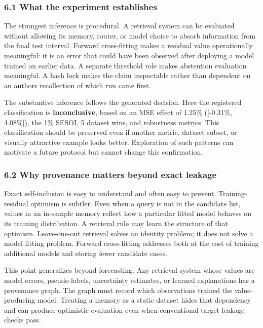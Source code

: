 \documentclass[
]{article}
\begin{document}
\subsubsection{6.1 What the experiment
establishes}\label{61-what-the-experiment-establishes}

The strongest inference is procedural. A retrieval system can be
evaluated without allowing its memory, router, or model choice to absorb
information from the final test interval. Forward cross-fitting makes a
residual value operationally meaningful: it is an error that could have
been observed after deploying a model trained on earlier data. A
separate threshold role makes abstention evaluation meaningful. A hash
lock makes the claim inspectable rather than dependent on an
author\textquotesingle s recollection of which run came first.

The substantive inference follows the generated decision. Here the
registered classification is \textbf{inconclusive}, based on an MSE
effect of 1.25\% ({[}-0.31\%, 4.08\%{]}), the 1\% SESOI, 5 dataset wins,
and robustness metrics. This classification should be preserved even if
another metric, dataset subset, or visually attractive example looks
better. Exploration of such patterns can motivate a future protocol but
cannot change this confirmation.

\subsubsection{6.2 Why provenance matters beyond exact
leakage}\label{62-why-provenance-matters-beyond-exact-leakage}

Exact self-inclusion is easy to understand and often easy to prevent.
Training-residual optimism is subtler. Even when a query is not in the
candidate list, values in an in-sample memory reflect how a particular
fitted model behaves on its training distribution. A retrieval rule may
learn the structure of that optimism. Leave-one-out retrieval solves an
identity problem; it does not solve a model-fitting problem. Forward
cross-fitting addresses both at the cost of training additional models
and storing fewer candidate cases.

This point generalizes beyond forecasting. Any retrieval system whose
values are model errors, pseudo-labels, uncertainty estimates, or
learned explanations has a provenance graph. The graph must record which
observations trained the value-producing model. Treating a memory as a
static dataset hides that dependency and can produce optimistic
evaluation even when conventional target leakage checks pass.
\end{document}
